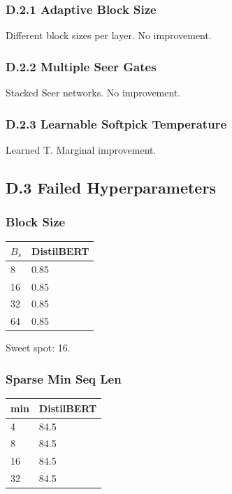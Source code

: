 \subsubsection{D.2.1 Adaptive Block Size}

Different block sizes per layer. No improvement.

\subsubsection{D.2.2 Multiple Seer Gates}

Stacked Seer networks. No improvement.

\subsubsection{D.2.3 Learnable Softpick Temperature}

Learned T. Marginal improvement.

\subsection{D.3 Failed Hyperparameters}

\subsubsection{Block Size}

\begin{table}[H]
\centering
\small
\begin{tabular}{ll}
\toprule
\textbf{$B_s$} & \textbf{DistilBERT} \\
\midrule
8 & 0.85 \\
16 & 0.85 \\
32 & 0.85 \\
64 & 0.85 \\
\bottomrule
\end{tabular}
\end{table}

Sweet spot: 16.

\subsubsection{Sparse Min Seq Len}

\begin{table}[H]
\centering
\small
\begin{tabular}{ll}
\toprule
\textbf{min} & \textbf{DistilBERT} \\
\midrule
4 & 84.5 \\
8 & 84.5 \\
16 & 84.5 \\
32 & 84.5 \\
\bottomrule
\end{tabular}
\end{table}

